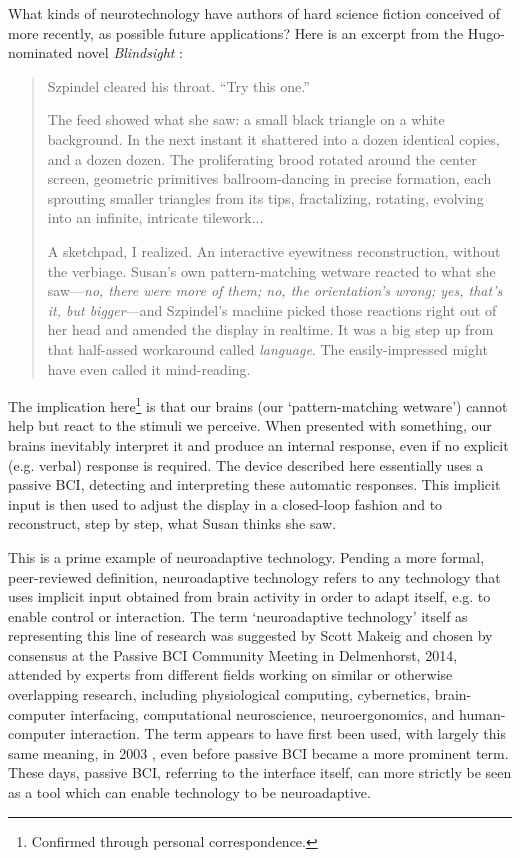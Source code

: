 What kinds of neurotechnology have authors of hard science fiction conceived of more recently, as possible future applications? Here is an excerpt from the Hugo-nominated novel \emph{Blindsight} \cite{watts2006blindsight}:

\begin{quote}
    Szpindel cleared his throat. ``Try this one.''

    The feed showed what she saw: a small black triangle on a white background. In the next instant it shattered into a dozen identical copies, and a dozen dozen. The proliferating brood rotated around the center screen, geometric primitives ballroom-dancing in precise formation, each sprouting smaller triangles from its tips, fractalizing, rotating, evolving into an infinite, intricate tilework...

    A sketchpad, I realized. An interactive eyewitness reconstruction, without the verbiage. Susan's own pattern-matching wetware reacted to what she saw---\emph{no, there were more of them; no, the orientation's wrong; yes, that's it, but bigger}---and Szpindel's machine picked those reactions right out of her head and amended the display in realtime. It was a big step up from that half-assed workaround called \emph{language}. The easily-impressed might have even called it mind-reading.
\end{quote}

The implication here\footnote{Confirmed through personal correspondence.} is that our brains (our `pattern-matching wetware') cannot help but react to the stimuli we perceive. When presented with something, our brains inevitably interpret it and produce an internal response, even if no explicit (e.g. verbal) response is required. The device described here essentially uses a passive BCI, detecting and interpreting these automatic responses. This implicit input is then used to adjust the display in a closed-loop fashion and to reconstruct, step by step, what Susan thinks she saw.

This is a prime example of neuroadaptive technology. Pending a more formal, peer-reviewed definition, neuroadaptive technology refers to any technology that uses implicit input obtained from brain activity in order to adapt itself, e.g. to enable control or interaction. The term `neuroadaptive technology' itself as representing this line of research was suggested by Scott Makeig and chosen by consensus at the Passive BCI Community Meeting in Delmenhorst, 2014, attended by experts from different fields working on similar or otherwise overlapping research, including physiological computing, cybernetics, brain-computer interfacing, computational neuroscience, neuroergonomics, and human-computer interaction. The term appears to have first been used, with largely this same meaning, in 2003 \cite{hettinger2003neuroadaptive}, even before passive BCI became a more prominent term. These days, passive BCI, referring to the interface itself, can more strictly be seen as a tool which can enable technology to be neuroadaptive.

